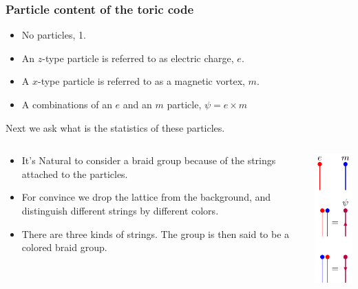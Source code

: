 \documentclass{beamer}
\renewcommand{\(}{\left(}
\renewcommand{\)}{\right)}
\renewcommand{\[}{\left[}
\renewcommand{\]}{\right]}
\begin{document}
\begin{frame}
    \frametitle{Particle content of the toric code}

    \begin{itemize}
        \item No particles, 1.
        \item An $z$-type particle is referred to as electric charge, $e$.
        \item A $x$-type particle is referred to as a magnetic vortex, $m$.
        \item A combinations of an $e$ and an $m$ particle, $\psi = e \times m$
    \end{itemize}
    \pause
    Next we ask what is the statistics of these particles. 
    \begin{columns}
        \begin{column}{0.85\textwidth}
            \begin{itemize}
                \item It's Natural to consider a braid group because of the strings attached to the particles.
                \item For convince we drop the lattice from the background, and distinguish different strings by different colors.
                \item There are three kinds of strings. The group is then said to be a colored braid group. 
            \end{itemize}
        \end{column}
    \begin{column}{0.15\textwidth}
        \centering
        \includegraphics[scale=1]{kinds_of_particles.pdf}
    \end{column}
    \end{columns}
\end{frame}
\end{document}
